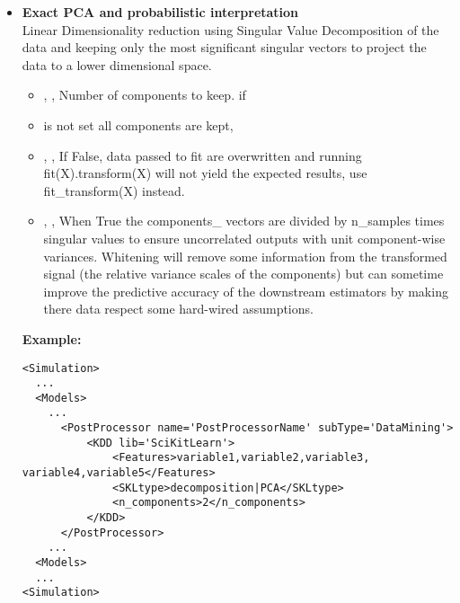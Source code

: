 \begin{itemize}
	\item \textbf{Exact PCA and probabilistic interpretation} \\
	Linear Dimensionality reduction using Singular Value Decomposition of
	the data and keeping only the most significant singular vectors to
	 project the data to a lower dimensional space.
	\begin{itemize}
		\item {}, , Number of components to keep. if
		\item {} is not set all components are kept,
		\item {}, , If False,
		 data passed to fit are overwritten and running fit(X).transform(X)
 		will not yield the expected results, use fit\_transform(X) instead.
		\item {}, , When True
		the components\_ vectors are divided by n\_samples times singular
		 values to ensure uncorrelated outputs with unit component-wise
		variances. Whitening will remove some information from the transformed
		 signal (the relative variance scales of the components) but can
		sometime improve the predictive accuracy of the downstream estimators
		 by making there data respect some hard-wired assumptions. 
	\end{itemize}
\textbf{Example:}
\begin{lstlisting}[style=XML,morekeywords={subType}]
<Simulation>
  ...
  <Models>
    ...
      <PostProcessor name='PostProcessorName' subType='DataMining'>
          <KDD lib='SciKitLearn'>
              <Features>variable1,variable2,variable3, variable4,variable5</Features>
              <SKLtype>decomposition|PCA</SKLtype>
              <n_components>2</n_components>
          </KDD>
      </PostProcessor>
    ...
  <Models>
  ...
<Simulation>
\end{lstlisting}



\end{itemize}

